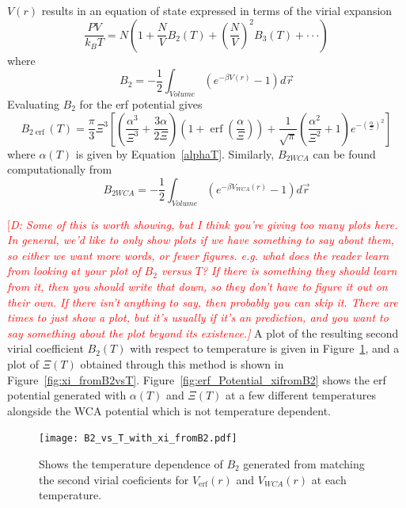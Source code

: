 \documentclass[double,12pt]{beavtex}
\newcommand\davidsays[1]{\textcolor{red}{[\it D: #1]}}
\begin{document}
$V(r)$ results in an equation of state expressed in terms of the virial expansion 
\begin{equation}\label{virialequation}
    \frac{PV}{k_BT}=N\left(1+\frac{N}{V}B_2(T)+\left(\frac{N}{V}\right)^2B_3(T)+ \cdot\cdot\cdot\right) 
\end{equation}
where 
\begin{equation}
	B_{2}=-\frac{1}{2}\int_{Volume}\left(e^{-\beta{V}(r)}-1\right)d\vec{r} 
\end{equation}
Evaluating $B_{2}$ for the erf potential gives
\begin{equation}
	B_{2\operatorname{erf}}(T) = \frac{\pi}{3}\Xi^3\left[\left(\frac{\alpha^3}{\Xi^3}+\frac{3\alpha}{2\Xi}\right)\left(1+\operatorname{\operatorname{erf}}\left(\frac{\alpha}{\Xi}\right)\right)+\frac{1}{\sqrt{\pi}}\left(\frac{\alpha^2}{\Xi^2}+1\right)e^{-\left(\frac{\alpha}{\Xi}\right)^2}\right]
\end{equation}
where $\alpha(T)$ is given by Equation~\ref{alphaT}. Similarly, 
$B_{2WCA}$ can be found computationally from 
\begin{equation}
	B_{2WCA}=-\frac{1}{2}\int_{Volume}\left(e^{-\beta{V}_{WCA}(r)}-1\right)d\vec{r} 
\end{equation}

\davidsays{Some of this is worth showing, but I think you're giving too many
plots here.
In general, we'd like to only show plots if we have something to say about them,
so either we want more words, or fewer figures.  e.g. what does the reader learn
from looking at your plot of $B_2$ versus $T$? If there is something they should
learn from it, then you should write that down, so they don't have to figure it
out on their own.  If there isn't anything to say, then probably you can skip
it. There \emph{are} times to just show a plot, but it's usually if it's an
prediction, and you want to say \emph{something} about the plot beyond its
existence.}
A plot of the resulting second virial coefficient $B_2(T)$  with respect 
to temperature is given in Figure~\ref{fig:B2vsT}, and a plot of $\Xi(T)$ obtained 
through this method is shown in Figure~\ref{fig:xi_fromB2vsT}. 
Figure~\ref{fig:erf_Potential_xifromB2} shows the erf potential generated with
$\alpha(T)$ and $\Xi(T)$ at a few different temperatures alongside the WCA 
potential which is not temperature dependent.

\begin{figure}[h!]
    \centering
    \texttt{[image: B2\_vs\_T\_with\_xi\_fromB2.pdf]}
    \caption{Shows the temperature dependence of $B_2$ generated from 
    matching the second virial coeficients for $V_{\operatorname{erf}}(r)$ and $V_{WCA}(r)$ 
    at each temperature.}
    \label{fig:B2vsT}
  \end{figure}
\end{document}
